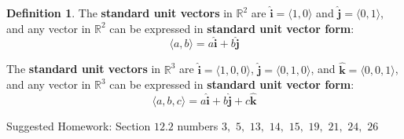 \documentclass[letterpaper, twoside, 12pt]{book}
\newcommand{\<}{\langle}
\renewcommand{\>}{\rangle}
\theoremstyle{definition}
\newtheorem{theorem}{Theorem}
\theoremstyle{definition}
\newtheorem{definition}[theorem]{Definition}
\newtheorem{problem}[theorem]{Problem}
\newcommand{\harpvec}[1]{\overrightharp{\ensuremath{\mathbf{#1}}}}
\newcommand*{\threevec}[3]{\ensuremath{\left\langle #1, #2, #3 \right\rangle}}
\newcommand{\veci}{\ensuremath{\mathbf{\widehat{i}}}}
\newcommand{\vecj}{\ensuremath{\mathbf{\widehat{j}}}}
\newcommand{\veck}{\ensuremath{\mathbf{\widehat{k}}}}
\begin{document}
\vfill

\begin{definition}
The \textbf{standard unit vectors} in $\mathbb{R}^2$ are
$\veci=\<1,0\>$ and $\vecj=\<0,1\>$, and any vector in $\mathbb{R}^2$
can be expressed in \textbf{standard unit vector form}:
  \[\<a,b\>=a\veci+b\vecj\]

The \textbf{standard unit vectors} in $\mathbb{R}^3$ are
$\veci=\<1,0,0\>$, $\vecj=\<0,1,0\>$, and $\veck=\<0,0,1\>$, and any vector in
$\mathbb{R}^3$ can be expressed in \textbf{standard unit vector form}:
  \[\<a,b,c\>=a\veci+b\vecj+c\veck\]
\end{definition}

\noindent Suggested Homework:
Section $12.2$ numbers $3,$ $5,$ $13,$ $14,$ $15,$ $19,$ $21,$ $24,$ $26$




\end{document}

